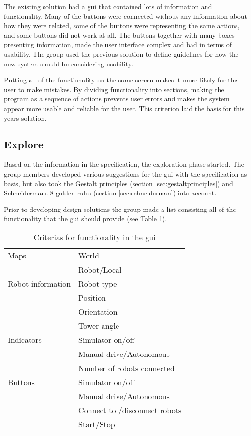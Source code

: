 The existing solution had a \acrshort{gui} that contained lots of information and functionality. Many of the buttons were connected without any information about how they were related, some of the buttons were representing the same actions, and some buttons did not work at all. The buttons together with many boxes presenting information, made the user interface complex and bad in terms of usability. The group used the previous solution to define guidelines for how the new system should be considering usability.

Putting all of the functionality on the same screen makes it more likely for the user to make mistakes. By dividing functionality into sections, making the program as a sequence of actions prevents user errors and makes the system appear more usable and reliable for the user. This criterion laid the basis for this years solution. 

\subsection{Explore}
\label{sec:explore}
Based on the information in the specification, the exploration phase started. The group members developed various suggestions for the \acrshort{gui} with the specification as basis, but also took the Gestalt principles (section \ref{sec:gestaltprinciples}) and Schneidermans 8 golden rules (section \ref{sec:schneiderman}) into account.

Prior to developing design solutions the group made a list consisting all of the functionality that the \acrshort{gui} should provide (see Table \ref{tab:guicriterias}).
\begin{table}[ht]
\begin{center}
 \begin{tabular}{|l l|} 
 \hline
 Maps               &   World \\
                    &   Robot/Local \\
 \hline
 Robot information  &   Robot type \\
                    &   Position \\
                    &   Orientation \\
                    &   Tower angle \\
 \hline
 Indicators         &   Simulator on/off \\
                    &   Manual drive/Autonomous \\
                    &   Number of robots connected \\
 \hline
 Buttons            &   Simulator on/off \\
                    &   Manual drive/Autonomous \\
                    &   Connect to /disconnect robots \\
                    &   Start/Stop \\

\hline
\end{tabular}
\end{center}
\caption{Criterias for functionality in the \acrshort{gui}}
\label{tab:guicriterias}
\end{table}

